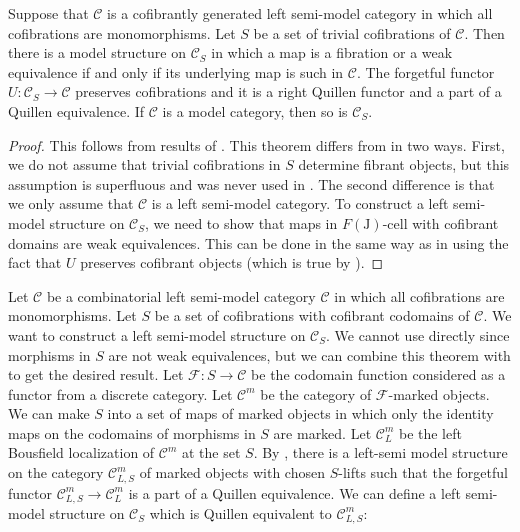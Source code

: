 \documentclass[reqno]{amsart}
\theoremstyle{definition}
\theoremstyle{remark}
\newcommand{\fs}[1]{\mathrm{#1}}
\newcommand{\cat}[1]{\mathcal{#1}}
\newcommand{\C}{\cat{C}}
\newcommand{\I}{\fs{I}}
\newcommand{\J}{\fs{J}}
\newcommand{\class}[2]{#1\text{-}\mathrm{#2}}
\newcommand{\Icell}[1][\I]{\class{#1}{cell}}
\numberwithin{figure}{section}
\begin{document}
\begin{thm}
Suppose that $\C$ is a cofibrantly generated left semi-model category in which all cofibrations are monomorphisms.
Let $S$ be a set of trivial cofibrations of $\C$.
Then there is a model structure on $\C_S$ in which a map is a fibration or a weak equivalence if and only if its underlying map is such in $\C$.
The forgetful functor $U : \C_S \to \C$ preserves cofibrations and it is a right Quillen functor and a part of a Quillen equivalence.
If $\C$ is a model category, then so is $\C_S$.
\end{thm}
\begin{proof}
This follows from results of \cite{algebraic-fibrant-objects}.
This theorem differs from \cite[Theorem~2.20]{algebraic-fibrant-objects} in two ways.
First, we do not assume that trivial cofibrations in $S$ determine fibrant objects, but this assumption is superfluous and was never used in \cite{algebraic-fibrant-objects}.
The second difference is that we only assume that $\C$ is a left semi-model category.
To construct a left semi-model structure on $\C_S$, we need to show that maps in $\Icell[F(\J)]$ with cofibrant domains are weak equivalences.
This can be done in the same way as in \cite[Theorem~2.20]{algebraic-fibrant-objects} using the fact that $U$ preserves cofibrant objects (which is true by \cite[Corollary~2.18]{algebraic-fibrant-objects}).
\end{proof}

Let $\C$ be a combinatorial left semi-model category $\C$ in which all cofibrations are monomorphisms.
Let $S$ be a set of cofibrations with cofibrant codomains of $\C$.
We want to construct a left semi-model structure on $\C_S$.
We cannot use  directly since morphisms in $S$ are not weak equivalences, but we can combine this theorem with  to get the desired result.
Let $\mathcal{F} : S \to \C$ be the codomain function considered as a functor from a discrete category.
Let $\C^m$ be the category of $\mathcal{F}$-marked objects.
We can make $S$ into a set of maps of marked objects in which only the identity maps on the codomains of morphisms in $S$ are marked.
Let $\C^m_L$ be the left Bousfield localization of $\C^m$ at the set $S$.
By , there is a left-semi model structure on the category $\C^m_{L,S}$ of marked objects with chosen $S$-lifts such that the forgetful functor $\C^m_{L,S} \to \C^m_L$ is a part of a Quillen equivalence.
We can define a left semi-model structure on $\C_S$ which is Quillen equivalent to $\C^m_{L,S}$:
\end{document}
